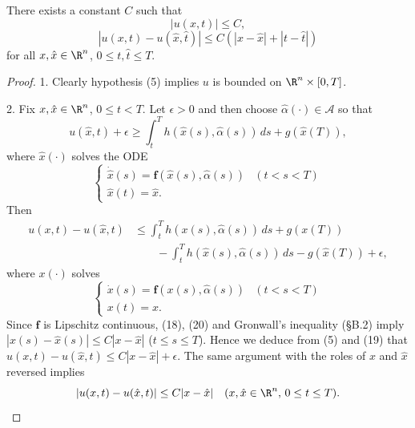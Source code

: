 \begin{lemma}
\label{lem:value-function-estimates}
There exists a constant $C$ such that
\[
|u(x,t)| \leq C,
\]
\[
|u(x,t) - u(\hat{x},\hat{t})| \leq C(|x - \hat{x}| + |t - \hat{t}|)
\]
for all $x, \hat{x} \in \R^n$, $0 \leq t, \hat{t} \leq T$.
\end{lemma}
\begin{proof}
1. Clearly hypothesis (5) implies $u$ is bounded on $\R^n \times [0,T]$.

2. Fix $x, \hat{x} \in \R^n$, $0 \leq t < T$. Let $\epsilon > 0$ and then choose $\hat{\alpha}(\cdot) \in \mathcal{A}$ so that
\[
u(\hat{x}, t) + \epsilon \geq \int_t^T h(\hat{x}(s), \hat{\alpha}(s)) \, ds + g(\hat{x}(T)),
\tag{17}
\]
where $\hat{x}(\cdot)$ solves the ODE
\[
\begin{cases} \dot{\hat{x}}(s) = \mathbf{f}(\hat{x}(s), \hat{\alpha}(s)) & (t < s < T) \\ \hat{x}(t) = \hat{x}. \end{cases}
\tag{18}
\]
Then
\[
\begin{aligned}
u(x, t) - u(\hat{x}, t) &\leq \int_t^T h(x(s), \hat{\alpha}(s)) \, ds + g(x(T)) \\
&\qquad - \int_t^T h(\hat{x}(s), \hat{\alpha}(s)) \, ds - g(\hat{x}(T)) + \epsilon,
\end{aligned}
\tag{19}
\]
where $x(\cdot)$ solves
\[
\begin{cases} \dot{x}(s) = \mathbf{f}(x(s), \hat{\alpha}(s)) & (t < s < T) \\ x(t) = x. \end{cases}
\tag{20}
\]
Since $\mathbf{f}$ is Lipschitz continuous, (18), (20) and Gronwall's inequality (\S B.2) imply $|x(s) - \hat{x}(s)| \leq C|x - \hat{x}|$ ($t \leq s \leq T$). Hence we deduce from (5) and (19) that $u(x,t) - u(\hat{x}, t) \leq C|x - \hat{x}| + \epsilon$. The same argument with the roles of $x$ and $\hat{x}$ reversed implies
\[
|u(x,t) - u(\hat{x}, t)| \leq C|x - \hat{x}| \quad (x, \hat{x} \in \R^n, \, 0 \leq t \leq T).
\]


\end{proof}
